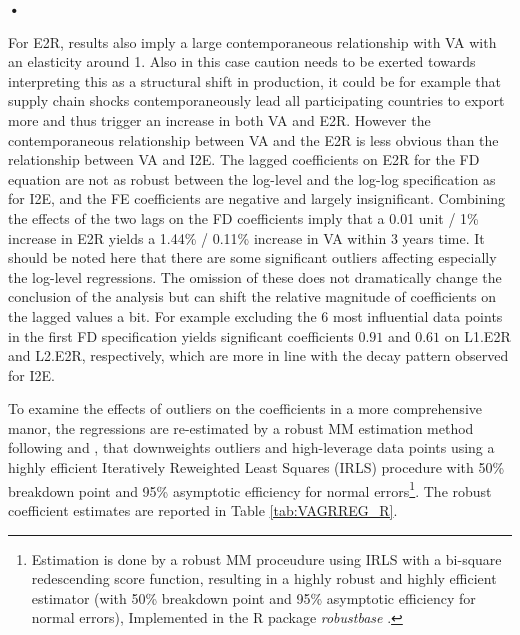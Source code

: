 \textbf{\textbf{•}}\documentclass[a4paper]{article}
\begin{document}


For E2R, results also imply a large contemporaneous relationship with VA with an elasticity around 1. Also in this case caution needs to be exerted towards interpreting this as a structural shift in production, it could be for example that supply chain shocks contemporaneously lead all participating countries to export more and thus trigger an increase in both VA and E2R. However the contemporaneous relationship between VA and the E2R is less obvious than the relationship between VA and I2E. The lagged coefficients on E2R for the FD equation are not as robust between the log-level and the log-log specification as for I2E, and the FE coefficients are negative and largely insignificant. Combining the effects of the two lags on the FD coefficients imply that a 0.01 unit / 1\% increase in E2R yields a  1.44\% / 0.11\% increase in VA within 3 years time. It should be noted here that there are some significant outliers affecting especially the log-level regressions. The omission of these does not dramatically change the conclusion of the analysis but can shift the relative magnitude of coefficients on the lagged values a bit. For example excluding the 6 most influential data points in the first FD specification yields significant coefficients $0.91$ and $0.61$ on L1.E2R and L2.E2R, respectively, which are more in line with the decay pattern observed for I2E. \newline 

To examine the effects of outliers on the coefficients in a more comprehensive manor, the regressions are re-estimated by a robust MM estimation method following \citet{yohai1987high} and \citet{koller2011sharpening}, that downweights outliers and high-leverage data points using a highly efficient Iteratively Reweighted Least Squares (IRLS) procedure with 50\% breakdown point and 95\% asymptotic efficiency for normal errors\footnote{Estimation is done by a robust MM proceudure using IRLS with a bi-square redescending score function, resulting in a highly robust and highly efficient estimator (with 50\% breakdown point and 95\% asymptotic efficiency for normal errors), Implemented in the R package \textit{robustbase} \citep{rousseeuw2009robustbase}.}. The robust coefficient estimates are reported in Table \ref{tab:VAGRREG_R}. 
\end{document}
